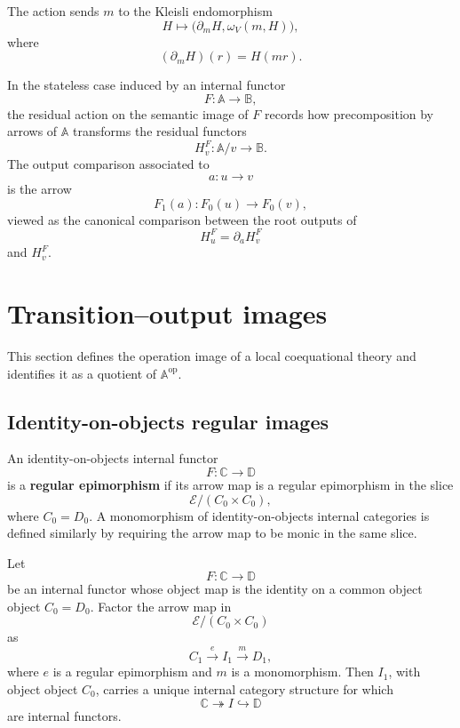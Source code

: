 The action sends \(m\) to the Kleisli endomorphism
\[
    H\longmapsto
    \bigl(\partial_mH,\omega_V(m,H)\bigr),
\]
where
\[
    (\partial_mH)(r)=H(mr).
\]

In the stateless case induced by an internal functor
\[
    F:\mathbb A\to\mathbb B,
\]
the residual action on the semantic image of \(F\) records how precomposition
by arrows of \(\mathbb A\) transforms the residual functors
\[
    H^F_v:\mathbb A/v\to\mathbb B.
\]
The output comparison associated to
\[
    a:u\to v
\]
is the arrow
\[
    F_1(a):F_0(u)\to F_0(v),
\]
viewed as the canonical comparison between the root outputs of
\[
    H^F_u=\partial_aH^F_v
\]
and \(H^F_v\).

\section{Transition--output images}
\label{sec:transition-output-images}

This section defines the operation image of a local coequational theory and
identifies it as a quotient of \(\mathbb A^{\mathrm{op}}\).

\subsection{Identity-on-objects regular images}
\label{subsec:identity-on-objects-regular-images}

\begin{definition}
\label{def:regular-epi-identity-on-objects-categories}
    An identity-on-objects internal functor
    \[
        F:\mathbb C\to\mathbb D
    \]
    is a \textbf{regular epimorphism} if its arrow map is a regular epimorphism
    in the slice
    \[
        \mathcal E/(C_0\times C_0),
    \]
    where \(C_0=D_0\). A monomorphism of identity-on-objects internal categories
    is defined similarly by requiring the arrow map to be monic in the same
    slice.
\end{definition}

\begin{lemma}
\label{lem:identity-on-objects-regular-images}
    Let
    \[
        F:\mathbb C\to\mathbb D
    \]
    be an internal functor whose object map is the identity on a common object
    object \(C_0=D_0\). Factor the arrow map in
    \[
        \mathcal E/(C_0\times C_0)
    \]
    as
    \[
        C_1\xrightarrow{e}I_1\xrightarrow{m}D_1,
    \]
    where \(e\) is a regular epimorphism and \(m\) is a monomorphism. Then
    \(I_1\), with object object \(C_0\), carries a unique internal category
    structure for which
    \[
        \mathbb C\twoheadrightarrow I\hookrightarrow \mathbb D
    \]
    are internal functors.
\end{lemma}

